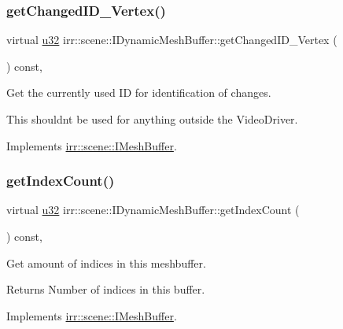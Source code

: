 \subsubsection{\texorpdfstring{get\+Changed\+I\+D\+\_\+\+Vertex()}{getChangedID\_Vertex()}}
{\footnotesize\ttfamily virtual \hyperlink{namespaceirr_a0416a53257075833e7002efd0a18e804}{u32} irr\+::scene\+::\+I\+Dynamic\+Mesh\+Buffer\+::get\+Changed\+I\+D\+\_\+\+Vertex (\begin{DoxyParamCaption}{ }\end{DoxyParamCaption}) const\hspace{0.3cm}{\ttfamily [inline]}, {\ttfamily [virtual]}}



Get the currently used ID for identification of changes. 

This shouldn\textquotesingle{}t be used for anything outside the Video\+Driver. 

Implements \hyperlink{classirr_1_1scene_1_1IMeshBuffer_aba48df31edf92a0117692c0be02298db}{irr\+::scene\+::\+I\+Mesh\+Buffer}.

\mbox{\label{classirr_1_1scene_1_1IDynamicMeshBuffer_adc483bdd7dfac4eb54e25c763ae1dae0}} 
\subsubsection{\texorpdfstring{get\+Index\+Count()}{getIndexCount()}}
{\footnotesize\ttfamily virtual \hyperlink{namespaceirr_a0416a53257075833e7002efd0a18e804}{u32} irr\+::scene\+::\+I\+Dynamic\+Mesh\+Buffer\+::get\+Index\+Count (\begin{DoxyParamCaption}{ }\end{DoxyParamCaption}) const\hspace{0.3cm}{\ttfamily [inline]}, {\ttfamily [virtual]}}



Get amount of indices in this meshbuffer. 

\begin{DoxyReturn}{Returns}
Number of indices in this buffer. 
\end{DoxyReturn}


Implements \hyperlink{classirr_1_1scene_1_1IMeshBuffer_a96e08662e15b1205516b87ada3301551}{irr\+::scene\+::\+I\+Mesh\+Buffer}.

